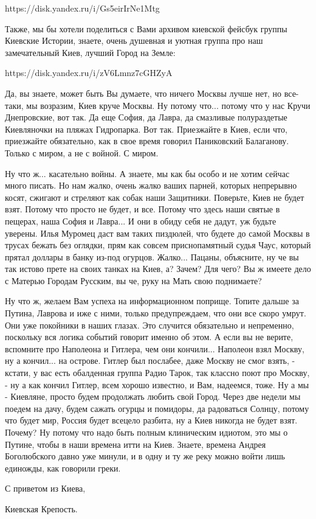 https://disk.yandex.ru/i/Gs5eirIrNe1Mtg

Также, мы бы хотели поделиться с Вами архивом киевской фейсбук группы Киевские Истории,
знаете, очень душевная и уютная группа про наш замечательный Киев, лучший Город на Земле:

https://disk.yandex.ru/i/zV6Lmnz7cGHZyA

Да, вы знаете, может быть Вы думаете, что ничего Москвы лучше нет, но все-таки,
мы возразим, Киев круче Москвы. Ну потому что... потому что у нас Кручи
Днепровские, вот так. Да еще София, да Лавра, да смазливые полураздетые
Киевляночки на пляжах Гидропарка. Вот так. Приезжайте в Киев, если что,
приезжайте обязательно, как в свое время говорил Паниковский Балаганову. Только
с миром, а не с войной. С миром.

Ну что ж... касательно войны. А знаете, мы как бы особо и не хотим сейчас много
писать.  Но нам жалко, очень жалко ваших парней, которых непрерывно косят,
сжигают и стреляют как собак наши Защитники. Поверьте, Киев не будет взят.
Потому что просто не будет, и все.  Потому что здесь наши святые в пещерах,
наша София и Лавра... И они в обиду себя не дадут, уж будьте уверены.  Илья
Муромец даст вам таких пиздюлей, что будете до самой Москвы в трусах бежать без
оглядки, прям как совсем приснопамятный судья Чаус, который прятал доллары в
банку из-под огурцов.  Жалко... Пацаны, объясните, ну че вы так истово прете на
своих танках на Киев, а?  Зачем? Для чего? Вы ж имеете дело с Матерью Городам
Русским, вы че, руку на Мать свою поднимаете? 

Ну что ж, желаем Вам успеха на информационном поприще.  Топите дальше за
Путина, Лаврова и иже с ними, только предупреждаем, что они все скоро умрут.
Они уже покойники в наших глазах.  Это случится обязательно и непременно,
поскольку вся логика событий говорит именно об этом.  А если вы не верите,
вспомните про Наполеона и Гитлера, чем они кончили... Наполеон взял Москву, ну
а кончил... на острове. Гитлер был послабее, даже Москву не смог взять, -
кстати, у вас есть обалденная группа Радио Тарок, так классно поют про Москву,
- ну а как кончил Гитлер, всем хорошо известно, и Вам, надеемся, тоже.  Ну а мы
- Киевляне, просто будем продолжать любить свой Город. Через две недели мы
поедем на дачу, будем сажать огурцы и помидоры, да радоваться Солнцу, потому
что будет мир, Россия будет всецело разбита, ну а Киев никогда не будет взят.
Почему?  Ну потому что надо быть полным клиническим идиотом, это мы о Путине,
чтобы в наши времена итти на Киев. Знаете, времена Андрея Боголюбского давно
уже минули, и в одну и ту же реку можно войти лишь единожды, как говорили
греки.

С приветом из Киева,

Киевская Крепость.




